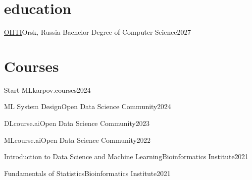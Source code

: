 \section{education}
  \resumeSubHeadingListStart

    \resumeSubheading
      {\href{https://og-ti.ru/}{OHTI}}{Orsk, Russia}
      {Bachelor Degree of Computer Science}{2027}

  \resumeSubHeadingListEnd

\section{Courses}
  \resumeSubHeadingListStart

    \resumeSubheading
    {Start ML}{karpov.courses}{2024}
    
    \resumeSubheading
    {ML System Design}{Open Data Science Community}{2024}
    
    \resumeSubheading
    {DLcourse.ai}{Open Data Science Community}{2023}
    
    \resumeSubheading
    {MLcourse.ai}{Open Data Science Community}{2022}

    \resumeSubheading
    {Introduction to Data Science and Machine Learning}{Bioinformatics Institute}{2021}

    \resumeSubheading
    {Fundamentals of Statistics}{Bioinformatics Institute}{2021}
    
  \resumeSubHeadingListEnd